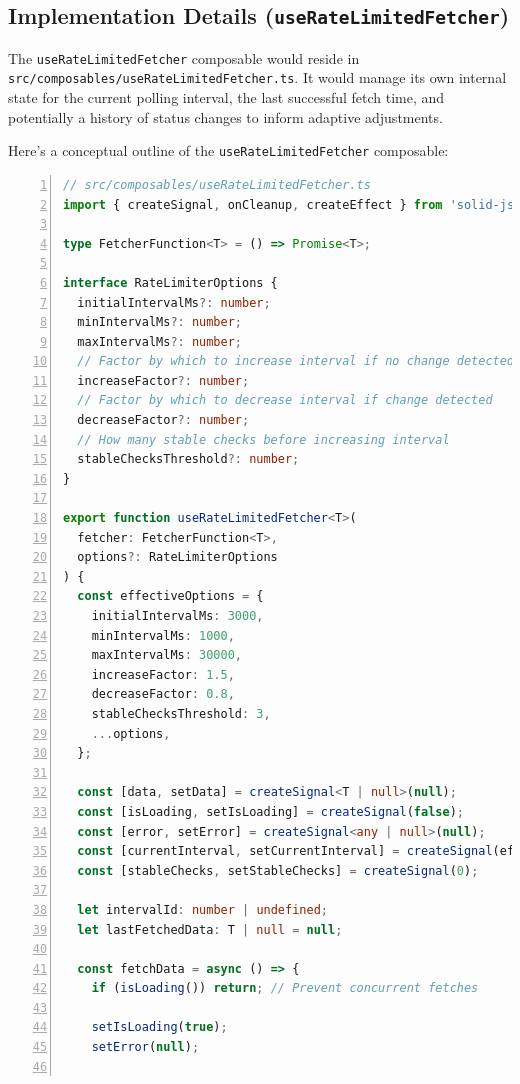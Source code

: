 \documentclass[10pt]{article}
\begin{document}
\subsection{Implementation Details (\texttt{useRateLimitedFetcher})}

The \texttt{useRateLimitedFetcher} composable would reside in \texttt{src/composables/useRateLimitedFetcher.ts}. It would manage its own internal state for the current polling interval, the last successful fetch time, and potentially a history of status changes to inform adaptive adjustments.

Here's a conceptual outline of the \texttt{useRateLimitedFetcher} composable:

\begin{lstlisting}[language=TypeScript, basicstyle=\small\ttfamily, numbers=left, xleftmargin=1em, xrightmargin=1em, breaklines=true]
// src/composables/useRateLimitedFetcher.ts
import { createSignal, onCleanup, createEffect } from 'solid-js';

type FetcherFunction<T> = () => Promise<T>;

interface RateLimiterOptions {
  initialIntervalMs?: number;
  minIntervalMs?: number;
  maxIntervalMs?: number;
  // Factor by which to increase interval if no change detected
  increaseFactor?: number;
  // Factor by which to decrease interval if change detected
  decreaseFactor?: number;
  // How many stable checks before increasing interval
  stableChecksThreshold?: number;
}

export function useRateLimitedFetcher<T>(
  fetcher: FetcherFunction<T>,
  options?: RateLimiterOptions
) {
  const effectiveOptions = {
    initialIntervalMs: 3000,
    minIntervalMs: 1000,
    maxIntervalMs: 30000,
    increaseFactor: 1.5,
    decreaseFactor: 0.8,
    stableChecksThreshold: 3,
    ...options,
  };

  const [data, setData] = createSignal<T | null>(null);
  const [isLoading, setIsLoading] = createSignal(false);
  const [error, setError] = createSignal<any | null>(null);
  const [currentInterval, setCurrentInterval] = createSignal(effectiveOptions.initialIntervalMs);
  const [stableChecks, setStableChecks] = createSignal(0);

  let intervalId: number | undefined;
  let lastFetchedData: T | null = null;

  const fetchData = async () => {
    if (isLoading()) return; // Prevent concurrent fetches

    setIsLoading(true);
    setError(null);


\end{lstlisting}
\end{document}
